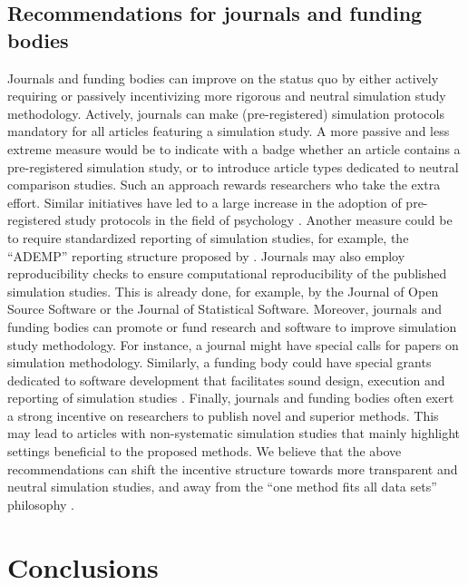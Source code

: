 \documentclass[a4paper, 11pt]{article}
\begin{document}
\subsection{Recommendations for journals and funding bodies}
Journals and funding bodies can improve on the status quo by either actively
requiring or passively incentivizing more rigorous and neutral simulation study
methodology. Actively, journals can make (pre-registered) simulation protocols
mandatory for all articles featuring a simulation study. A more passive and less
extreme measure would be to indicate with a badge whether an article contains
a pre-registered simulation study, or to introduce article types dedicated to
neutral comparison studies. Such an approach rewards researchers who take the
extra effort. Similar initiatives have led to a large increase in the adoption
of pre-registered study protocols in the field of psychology \citep{Kidwell2016}.
Another measure could be to require standardized reporting
of simulation studies, for example, the ``ADEMP'' reporting structure proposed by
\citet{Morris2019}. Journals may also employ reproducibility checks to ensure
computational reproducibility of the published simulation studies. This is
already done, for example, by the Journal of Open Source Software or the Journal
of Statistical Software. Moreover, journals and funding bodies can promote or fund
research and software to improve simulation study methodology. For instance, a
journal might have special calls for papers on simulation methodology. Similarly,
a funding body could have special grants dedicated to software development
that facilitates sound design, execution and reporting of simulation studies
\citep[as][]{White2010, Gasparini2018, Chalmers2020}.
Finally, journals and funding bodies often exert a strong incentive on researchers
to publish novel and superior methods. This may lead to articles with
non-systematic simulation studies that mainly highlight settings beneficial
to the proposed methods. We believe that the above recommendations
can shift the incentive structure towards more transparent and neutral
simulation studies, and away from the ``one method fits all data sets''
philosophy \citep{Strobl2022}.

\section{Conclusions} \label{sec:discussion}
\end{document}
